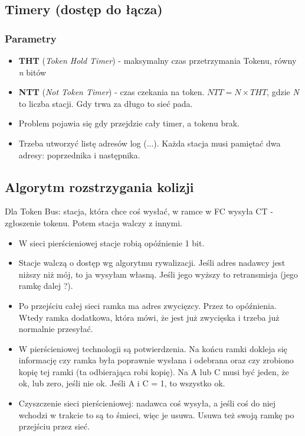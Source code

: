 \documentclass[a4paper,twoside]{article}
\begin{document}
		\subsection{Timery (dostęp do łącza)}
			\subsubsection{Parametry}
				\begin{itemize}
					\item \textbf{THT} (\emph{Token Hold Timer}) - maksymalny czas przetrzymania Tokenu, równy \emph{n} bitów
					\item \textbf{NTT} (\emph{Not Token Timer}) - czas czekania na token. $ NTT=N\times THT $, gdzie \emph{N} to liczba stacji. Gdy trwa za długo to sieć pada.
					\item Problem pojawia się gdy przejdzie cały timer, a tokenu brak.
					\item Trzeba utworzyć listę adresów log (...). Każda stacja musi pamiętać dwa adresy: poprzednika i następnika.
				\end{itemize}
		\subsection{Algorytm rozstrzygania kolizji}
			Dla Token Bus: stacja, która chce coś wysłać, w ramce w FC wysyła CT - zgłoszenie tokenu. Potem stacja walczy z innymi.
			\begin{itemize}
				\item W sieci pierścieniowej stacje robią opóźnienie 1 bit.
				\item Stacje walczą o dostęp wg algorytmu rywalizacji. Jeśli adres nadawcy jest niższy niż mój, to ja wysyłam własną. Jeśli jego wyższy to retransmisja (jego ramkę dalej ?).
				\item Po przejściu całej sieci ramka ma adres zwycięzcy. Przez to opóźnienia. Wtedy ramka dodatkowa, która mówi, że jest już zwycięska i trzeba już normalnie przesyłać.
				\item W pierścieniowej technologii są potwierdzenia. Na końcu ramki dokleja się informację czy ramka była poprawnie wysłana i odebrana oraz czy zrobiono kopię tej ramki (ta odbierająca robi kopię). Na A lub C musi być jeden, że ok, lub zero, jeśli nie ok. Jeśli A i C = 1, to wszystko ok.
				\item Czyszczenie sieci pierścieniowej: nadawca coś wysyła, a jeśli coś do niej wchodzi w trakcie to są to śmieci, więc je usuwa. Usuwa też swoją ramkę po przejściu przez sieć.
			\end{itemize}
\end{document}
